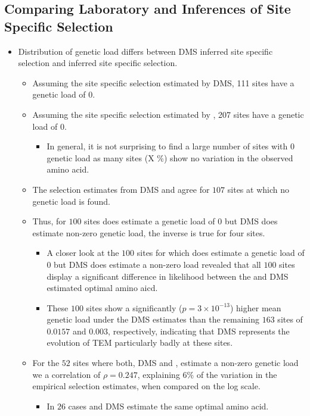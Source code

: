 \documentclass[12pt]{article}
\begin{document}
\subsection*{Comparing Laboratory and \selac Inferences of Site Specific Selection}
\begin{itemize}
	\item Distribution of genetic load differs between DMS inferred site specific selection and \selac inferred site specific selection.
	\begin{itemize}
		\item Assuming the site specific selection estimated by DMS, 111 sites have a genetic load of 0.
		\item Assuming the site specific selection estimated by \selac, 207 sites have a genetic load of 0.
		\begin{itemize}
			\item In general, it is not surprising to find a large number of sites with 0 genetic load as many sites (X \%) show no variation in the observed amino acid.
		\end{itemize}
		\item The selection estimates from DMS and \selac agree for $107$ sites at which no genetic load is found.
		\item Thus, for $100$ sites \selac does estimate a genetic load of 0 but DMS does estimate non-zero genetic load, the inverse is true for four sites.
		\begin{itemize}
			\item A closer look at the $100$ sites for which \selac does estimate a genetic load of $0$ but DMS does estimate a non-zero load revealed that all $100$ sites display a significant difference in likelihood between the \selac and DMS estimated optimal amino aicd.
			\item These $100$ sites show a significantly ($p = 3\times10^{-13}$) higher mean genetic load under the DMS estimates than the remaining $163$ sites of $0.0157$ and $0.003$, respectively, indicating that DMS represents the evolution of TEM particularly badly at these sites.
		\end{itemize}
		\item For the $52$ sites where both, DMS and \selac, estimate a non-zero genetic load we a correlation of $\rho = 0.247$, explaining $6 \%$ of the variation in the empirical selection estimates, when compared on the log scale.
		\begin{itemize}
			\item In $26$ cases \selac and DMS estimate the same optimal amino acid.

\end{itemize}
\end{itemize}
\end{itemize}
\end{document}
